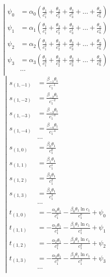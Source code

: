 \begin{equation*} \left| \begin{aligned}
\psi_0 &= \alpha_0 \left(
  \frac{\theta_1}{c_1^0}
+ \frac{\theta_2}{c_2^0}
+ \frac{\theta_3}{c_3^0}
+ \ldots
+ \frac{\theta_n}{c_n^0} \right) \\
%
\psi_1 &= \alpha_1 \left(
  \frac{\theta_1}{c_1^1}
+ \frac{\theta_2}{c_2^1}
+ \frac{\theta_3}{c_3^1}
+ \ldots
+ \frac{\theta_n}{c_n^1} \right) \\
%
\psi_2 &= \alpha_2 \left(
  \frac{\theta_1}{c_1^2}
+ \frac{\theta_2}{c_2^2}
+ \frac{\theta_3}{c_3^2}
+ \ldots
+ \frac{\theta_n}{c_n^2} \right) \\
%
\psi_3 &= \alpha_3 \left(
  \frac{\theta_1}{c_1^3}
+ \frac{\theta_2}{c_2^3}
+ \frac{\theta_3}{c_3^3}
+ \ldots
+ \frac{\theta_n}{c_n^3} \right) \\
%
&\ldots \\
\end{aligned} \right. \end{equation*}
%
\begin{equation*} \left| \begin{aligned}
%
s_{(1,-1)} &=
  \frac{\beta_{-1} \theta_1}{c_1^{-1}} \\
%
s_{(1,-2)} &=
  \frac{\beta_{-2} \theta_1}{c_1^{-2}} \\
%
s_{(1,-3)} &=
  \frac{\beta_{-3} \theta_1}{c_1^{-3}} \\
%
s_{(1,-4)} &=
  \frac{\beta_{-4} \theta_1}{c_1^{-4}} \\
%
&\ldots \\
%
s_{(1,0)} &=
  \frac{\beta_0 \theta_1}{c_1^0} \\
%
s_{(1,1)} &=
  \frac{\beta_1 \theta_1}{c_1^1} \\
%
s_{(1,2)} &=
  \frac{\beta_2 \theta_1}{c_1^2} \\
%
s_{(1,3)} &=
  \frac{\beta_3 \theta_1}{c_1^3} \\
%
&\ldots \\
%
t_{(1,0)} &=
- \frac{\alpha_0 \theta_1}{c_1^0}
- \frac{\beta_0 \theta_1 \ln{c_1}}{c_1^0}
+ \psi_0 \\
%
t_{(1,1)} &=
- \frac{\alpha_1 \theta_1}{c_1^1}
- \frac{\beta_1 \theta_1 \ln{c_1}}{c_1^1}
+ \psi_1 \\
%
t_{(1,2)} &=
- \frac{\alpha_2 \theta_1}{c_1^2}
- \frac{\beta_2 \theta_1 \ln{c_1}}{c_1^2}
+ \psi_2 \\
%
t_{(1,3)} &=
- \frac{\alpha_3 \theta_1}{c_1^3}
- \frac{\beta_3 \theta_1 \ln{c_1}}{c_1^3}
+ \psi_3 \\
%
&\ldots \\
\end{aligned} \right. \end{equation*}

